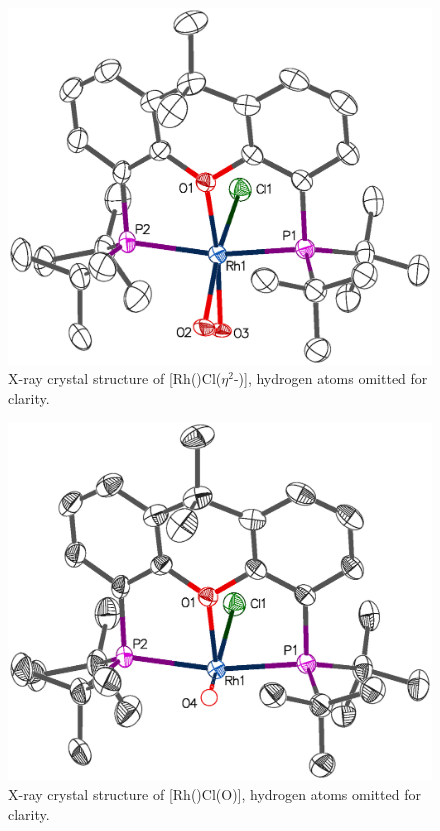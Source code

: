 \begin{figure}[htbp]
\begin{center}
\includegraphics[scale=0.55]{../Crystalstructures/MRMN-Ga-dioxygen.eps}
\caption[X-ray crystal structure of [Rh(\tBuxantphos)Cl($\eta^2$-){]}]{X-ray crystal structure of [Rh(\tBuxantphos)Cl($\eta^2$-)], hydrogen atoms omitted for clarity.}
\label{Crystal:rhodium}
\end{center}
\end{figure}

\begin{figure}[hbtp]
\begin{center}
\includegraphics[scale=0.55]{../Crystalstructures/MRMN-Ga-oxo.eps}
\caption[X-ray crystal structure of [Rh(\tBuxantphosk)Cl(O)]{X-ray crystal structure of [Rh(\tBuxantphosk)Cl(O)], hydrogen atoms omitted for clarity.}
\label{Crystal:rhodiumoxo}
\end{center}
\end{figure}

